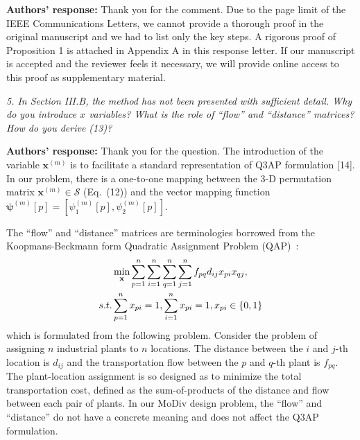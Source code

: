 \documentclass[onecolumn, 11pt, draftclsnofoot]{IEEEtran}
\begin{document}
\noindent \textbf{Authors' response:}
Thank you for the comment. Due to the page limit of the IEEE Communications
Letters, we cannot provide a thorough proof in the original manuscript and we
had to list only the key steps. A rigorous proof of Proposition 1 is attached
in Appendix A in this response letter. If our manuscript is accepted and the
reviewer feels it necessary, we will provide online access to this proof as
supplementary material.

 
\vspace{0.5cm}

\noindent
\emph{5. In Section III.B, the method has not been presented with sufficient
detail. Why do you introduce $x$ variables? What is the role of ``flow'' and
``distance'' matrices? How do you derive (13)?}

\noindent \textbf{Authors' response:}
Thank you for the question. The introduction of the variable $\mathbf{x}^{(m)}$
is to facilitate a standard representation of Q3AP formulation
[14]\citep[R][]{frieze1974bilinear}\citep[R][]{balas1991algorithm}\citep[R][]{burkard1999linear}\citep[R][]{5587019}.
In our problem, there is a one-to-one mapping between the 3-D permutation matrix
$\mathbf{x}^{(m)}\in\mathcal{S}$ (Eq.~(12)) and the vector mapping function
$\bm{\psi}^{(m)}[p] = [\psi_1^{(m)}[p], \psi_2^{(m)}[p]]$. 

The ``flow'' and ``distance'' matrices are terminologies borrowed from the
Koopmans-Beckmann form Quadratic Assignment Problem
(QAP)~\citep[R][]{koopmans1957assignment}\citep[R][]{806935}:
\begin{align}
  & \min_{\mathbf{x}}
  \sum_{p=1}^{n}\sum_{i=1}^{n}
  \sum_{q=1}^{n}\sum_{j=1}^{n}
  f_{pq}d_{ij}x_{pi}x_{qj},\notag\\
  \mbox{s.t. } & \sum_{p=1}^{n}x_{pi} =
  1,\sum_{i=1}^{n}x_{pi} = 1, x_{pi}\in\{0, 1\}
\end{align}
which is formulated from the following problem. Consider the problem of
assigning $n$ industrial plants to $n$ locations. The distance between the $i$
and $j$-th location is $d_{ij}$ and the transportation flow between the $p$ and
$q$-th plant is $f_{pq}$. The plant-location assignment is so designed as to
minimize the total transportation cost, defined as the sum-of-products of the
distance and flow between each pair of plants. In our MoDiv design problem, the
``flow'' and ``distance'' do not have a concrete meaning and does not affect
the Q3AP formulation.
\end{document}

